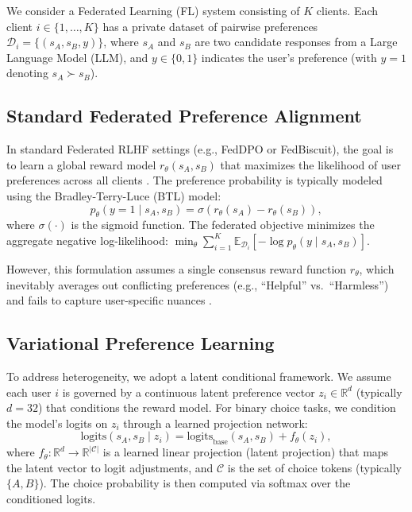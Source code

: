 We consider a Federated Learning (FL) system consisting of $K$ clients. Each client $i \in \{1, \ldots, K\}$ has a private dataset of pairwise preferences $\mathcal{D}_i = \{(s_A, s_B, y)\}$, where $s_A$ and $s_B$ are two candidate responses from a Large Language Model (LLM), and $y \in \{0, 1\}$ indicates the user's preference (with $y=1$ denoting $s_A \succ s_B$).

\subsection{Standard Federated Preference Alignment}
\label{sec:prelim-standard}
In standard Federated RLHF settings (e.g., FedDPO or FedBiscuit), the goal is to learn a global reward model $r_\theta(s_A, s_B)$ that maximizes the likelihood of user preferences across all clients \citep{wu2024towards}. The preference probability is typically modeled using the Bradley-Terry-Luce (BTL) model:
\begin{equation}
    p_\theta(y=1 \mid s_A, s_B) = \sigma \left( r_\theta(s_A) - r_\theta(s_B) \right),
\end{equation}
where $\sigma(\cdot)$ is the sigmoid function. The federated objective minimizes the aggregate negative log-likelihood: $\min_\theta \sum_{i=1}^K \mathbb{E}_{\mathcal{D}_i} [-\log p_\theta(y \mid s_A, s_B)]$.

However, this formulation assumes a single consensus reward function $r_\theta$, which inevitably averages out conflicting preferences (e.g., ``Helpful'' vs.\ ``Harmless'') and fails to capture user-specific nuances \citep{poddar2024personalizing}.

\subsection{Variational Preference Learning}
\label{sec:prelim-vpl}
To address heterogeneity, we adopt a latent conditional framework. We assume each user $i$ is governed by a continuous latent preference vector $z_i \in \mathbb{R}^d$ (typically $d=32$) that conditions the reward model. For binary choice tasks, we condition the model's logits on $z_i$ through a learned projection network:
\begin{equation}
    \text{logits}(s_A, s_B \mid z_i) = \text{logits}_{\text{base}}(s_A, s_B) + f_\theta(z_i),
\end{equation}
where $f_\theta: \mathbb{R}^d \to \mathbb{R}^{|\mathcal{C}|}$ is a learned linear projection (latent projection) that maps the latent vector to logit adjustments, and $\mathcal{C}$ is the set of choice tokens (typically $\{A, B\}$). The choice probability is then computed via softmax over the conditioned logits.

